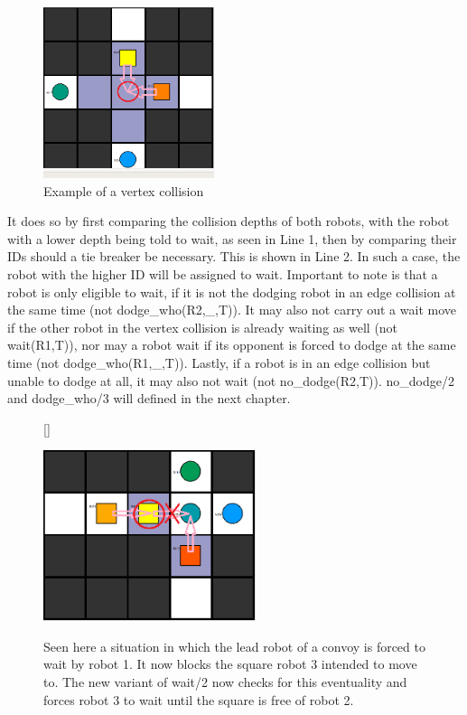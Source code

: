 \documentclass{llncs}
\begin{document}
\begin{figure}
    \centering
    \includegraphics[width=5cm,height=5cm,keepaspectratio]{vertex}

\caption{Example of a vertex collision}
\end{figure}
It does so by first comparing the collision depths of both robots, with the robot with a lower depth being told to wait, as seen in Line 1, then by comparing their IDs should a tie breaker be necessary. This is shown in Line 2. In such a case, the robot with the higher ID will be assigned to wait.\newline
Important to note is that a robot is only eligible to wait, if it is not the dodging robot in an edge collision at the same time (not dodge\_who(R2,\_,T)). It may also not carry out a wait move if the other robot in the vertex collision is already waiting as well (not wait(R1,T)), nor may a robot wait if its opponent is forced to dodge at the same time (not dodge\_who(R1,\_,T)). Lastly, if a robot is in an edge collision but unable to dodge at all, it may also not wait (not no\_dodge(R2,T)). no\_dodge/2 and dodge\_who/3 will defined in the next chapter.\newline
\begin{figure}[h!]
[\FBwidth]
{\caption{Seen here a situation in which the lead robot of a convoy is forced to wait by robot 1. It now blocks the square robot 3 intended to move to. The new variant of wait/2 now checks for this eventuality and forces robot 3 to wait until the square is free of robot 2.}\label{fig:test}}
{\includegraphics[width=\textwidth, height= 5cm, keepaspectratio]{convoy}}
\end{figure}\newline
\end{document}
